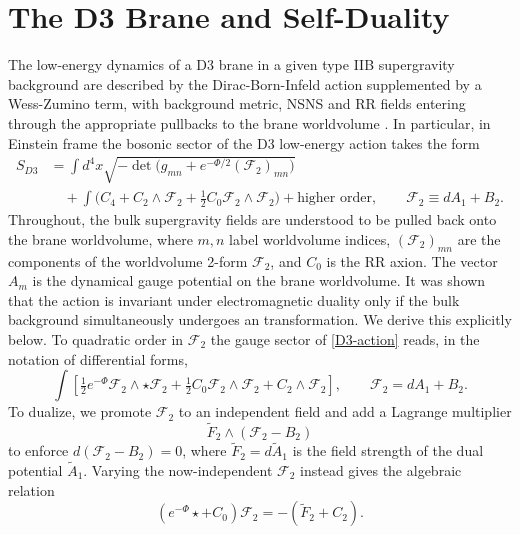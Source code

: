 \section{The D3 Brane and Self-Duality}
\label{sec:d3-self-duality}
The low-energy dynamics of a D3 brane in a given type IIB supergravity background are described by the Dirac-Born-Infeld action supplemented by a Wess-Zumino term, with background metric, NSNS and RR fields entering through the appropriate pullbacks to the brane worldvolume \cite{Leigh:1989jq,Polchinski:1998rr}.
In particular, in Einstein frame the bosonic sector of the D3 low-energy action takes the form \cite{Tseytlin:1996it}
\begin{equation}
\begin{aligned}
S_{D3}
&=\int d^4x \sqrt{-\det\big({g}_{mn} + e^{-\Phi/2} (\mathcal{F}_2)_{mn}\big)}\\
&\quad+\int \Big(C_4 + C_2\wedge \mathcal{F}_2 + \tfrac{1}{2} C_0 \mathcal{F}_2\wedge\mathcal{F}_2\Big)
+\text{higher order},\qquad
\mathcal{F}_2 \equiv dA_1+B_2 .
\end{aligned}
\label{D3-action}
\end{equation}
Throughout, the bulk supergravity fields are understood to be pulled back onto the brane worldvolume, where $m,n$ label worldvolume indices, $(\mathcal{F}_2)_{mn}$ are the components of the worldvolume 2-form $\mathcal{F}_2$, and $C_0$ is the RR axion.
The vector $A_m$ is the dynamical gauge potential on the brane worldvolume.
It was shown \cite{Tseytlin:1996it} that the action is invariant under electromagnetic duality only if the bulk background simultaneously undergoes an \SLZ{} transformation.
We derive this explicitly below.
To quadratic order in $\mathcal F_2$ the gauge sector of \eqref{D3-action} reads, in the notation of differential forms,
\begin{equation}
\int\left[\tfrac{1}{2}e^{-\Phi}\mathcal F_2\wedge\star\mathcal F_2+\tfrac{1}{2}C_0\mathcal F_2\wedge\mathcal F_2+C_2\wedge\mathcal F_2\right],\qquad \mathcal F_2 = dA_1+B_2.
\end{equation}
To dualize, we promote $\mathcal F_2$ to an independent field and add a Lagrange multiplier 
\begin{equation}
\tilde{F}_2 \wedge (\mathcal{F}_2 - B_2)
\end{equation}
to enforce $d(\mathcal F_2-B_2) = 0$, where $\tilde F_2 = d\tilde A_1$ is the field strength of the dual potential $\tilde A_1$.
Varying the now-independent $\mathcal F_2$ instead gives the algebraic relation
\begin{equation}
(e^{-\Phi}\star + C_0)\mathcal F_2 = -(\tilde F_2+C_2).
\label{D3-integrating-out-mathcal-F}
\end{equation}
